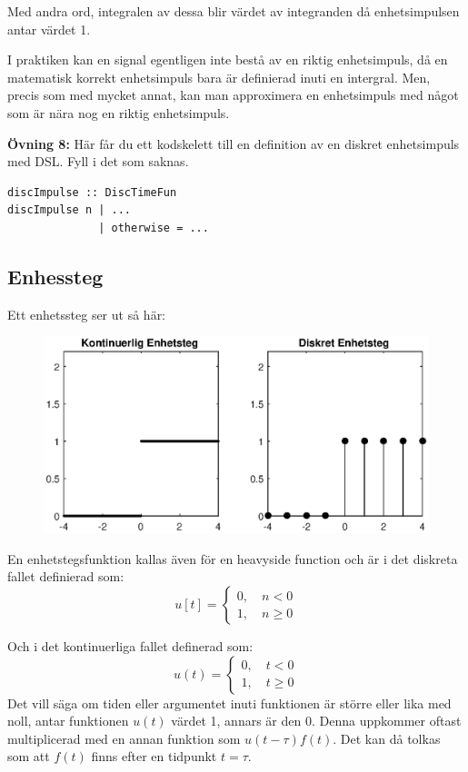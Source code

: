 \documentclass{article}
\begin{document}
Med andra ord, integralen av dessa blir värdet av integranden då
enhetsimpulsen antar värdet 1.

I praktiken kan en signal egentligen inte bestå av en riktig enhetsimpuls,
då en matematisk korrekt enhetsimpuls bara är definierad inuti en intergral.
Men, precis som med mycket annat, kan man approximera en enhetsimpuls med något
som är nära nog en riktig enhetsimpuls.

\textbf{Övning 8:} Här får du ett kodskelett till en definition av en diskret
enhetsimpuls med DSL. Fyll i det som saknas.
\begin{verbatim}
discImpulse :: DiscTimeFun
discImpulse n | ...
              | otherwise = ...
\end{verbatim}

\subsection{Enhessteg}
Ett enhetssteg ser ut så här:

\begin{figure}[h]
\centerline{\includegraphics[scale=0.50]{heavy.eps}}
\caption{}
\label{}
\end{figure}

En enhetstegsfunktion kallas även för en heavyside function och är i det
diskreta fallet definierad som:
$$
u[t] =
\begin{cases}
0, \quad n < 0 \\
1, \quad n \geq 0
\end{cases}
$$

Och i det kontinuerliga fallet definerad som:
$$
u(t) =
\begin{cases}
0, \quad t < 0 \\
1, \quad t \geq 0
\end{cases}
$$
Det vill säga om tiden eller argumentet inuti funktionen är större eller lika
med noll, antar funktionen $u(t)$ värdet 1, annars är den 0.
Denna uppkommer oftast multiplicerad med en annan funktion som
$u(t-\tau) f(t)$. Det kan då tolkas som att $f(t)$ finns efter en tidpunkt $t = \tau$.
\end{document}
